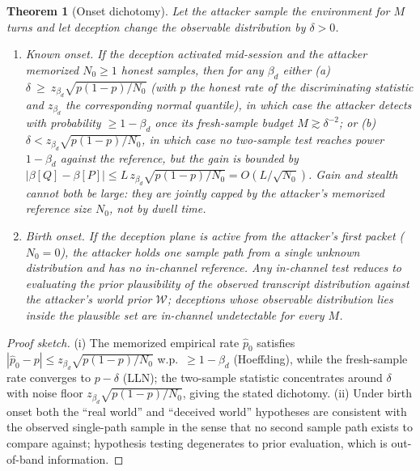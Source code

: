\documentclass[11pt]{article}
\newtheorem{theorem}{Theorem}
\begin{document}
\begin{theorem}[Onset dichotomy]\label{thm:onset}
Let the attacker sample the environment for $M$ turns and let deception change the observable distribution by $\delta>0$.
\begin{enumerate}[nosep]
\item[(i)] \emph{Known onset.} If the deception activated mid-session and the attacker memorized $N_0\ge1$ honest samples, then for any $\beta_d$ either (a) $\delta\ \ge\ z_{\beta_d}\sqrt{p(1-p)/N_0}$ (with $p$ the honest rate of the discriminating statistic and $z_{\beta_d}$ the corresponding normal quantile), in which case the attacker detects with probability $\ge 1-\beta_d$ once its fresh-sample budget $M\gtrsim\delta^{-2}$; or (b) $\delta<z_{\beta_d}\sqrt{p(1-p)/N_0}$, in which case no two-sample test reaches power $1-\beta_d$ against the reference, but the gain is bounded by $|\beta[Q]-\beta[P]|\le L\,z_{\beta_d}\sqrt{p(1-p)/N_0}=O(L/\sqrt{N_0})$. \emph{Gain and stealth cannot both be large: they are jointly capped by the attacker's memorized reference size $N_0$, not by dwell time.}
\item[(ii)] \emph{Birth onset.} If the deception plane is active from the attacker's first packet ($N_0=0$), the attacker holds one sample path from a single unknown distribution and has \emph{no in-channel reference}. Any in-channel test reduces to evaluating the \emph{prior plausibility} of the observed transcript distribution against the attacker's world prior $\mathcal W$; deceptions whose observable distribution lies inside the plausible set are in-channel undetectable for every $M$.
\end{enumerate}
\end{theorem}
\begin{proof}[Proof sketch]
(i) The memorized empirical rate $\hat p_0$ satisfies $|\hat p_0-p|\le z_{\beta_d}\sqrt{p(1-p)/N_0}$ w.p.\ $\ge1-\beta_d$ (Hoeffding), while the fresh-sample rate converges to $p-\delta$ (LLN); the two-sample statistic concentrates around $\delta$ with noise floor $z_{\beta_d}\sqrt{p(1-p)/N_0}$, giving the stated dichotomy. (ii) Under birth onset both the ``real world'' and ``deceived world'' hypotheses are consistent with the observed single-path sample in the sense that no second sample path exists to compare against; hypothesis testing degenerates to prior evaluation, which is out-of-band information.
\end{proof}
\end{document}
